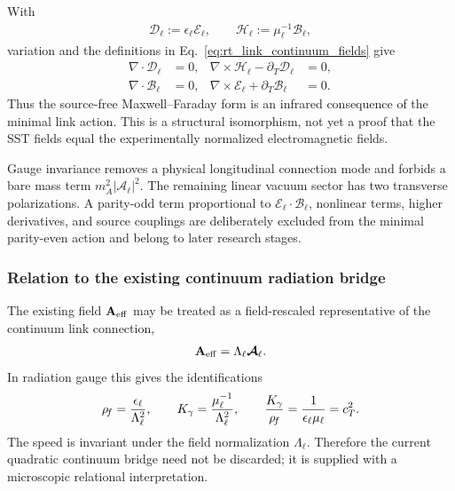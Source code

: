 With
\begin{align}
    \boldsymbol{\mathcal D}_\ell
    :=\epsilon_\ell\boldsymbol{\mathcal E}_\ell,
    \qquad
    \boldsymbol{\mathcal H}_\ell
    :=\mu_\ell^{-1}\boldsymbol{\mathcal B}_\ell,
\end{align}
variation and the definitions in Eq.~\eqref{eq:rt_link_continuum_fields} give
\begin{align}
    \nabla\cdot\boldsymbol{\mathcal D}_\ell&=0,
    &
    \nabla\times\boldsymbol{\mathcal H}_\ell
    -\partial_T\boldsymbol{\mathcal D}_\ell&=0,
    \\
    \nabla\cdot\boldsymbol{\mathcal B}_\ell&=0,
    &
    \nabla\times\boldsymbol{\mathcal E}_\ell
    +\partial_T\boldsymbol{\mathcal B}_\ell&=0.
    \label{eq:rt_link_source_free_maxwell_structure}
\end{align}
Thus the source-free Maxwell--Faraday form is an infrared consequence of the
minimal link action.  This is a structural isomorphism, not yet a proof that the
SST fields equal the experimentally normalized electromagnetic fields.

Gauge invariance removes a physical longitudinal connection mode and forbids a
bare mass term $m_A^2|\boldsymbol{\mathcal A}_\ell|^2$.  The remaining linear
vacuum sector has two transverse polarizations.  A parity-odd term proportional
to $\boldsymbol{\mathcal E}_\ell\cdot\boldsymbol{\mathcal B}_\ell$, nonlinear
terms, higher derivatives, and source couplings are deliberately excluded from
the minimal parity-even action and belong to later research stages.

\subsubsection{Relation to the existing continuum radiation bridge}

The existing field $\mathbf A_{\rm eff}$ may be treated as a field-rescaled
representative of the continuum link connection,
\begin{align}
    \mathbf A_{\rm eff}
    =
    \Lambda_\ell\boldsymbol{\mathcal A}_\ell.
\end{align}
In radiation gauge this gives the identifications
\begin{align}
    \rho_{\!f}
    =
    \frac{\epsilon_\ell}{\Lambda_\ell^2},
    \qquad
    K_\gamma
    =
    \frac{\mu_\ell^{-1}}{\Lambda_\ell^2},
    \qquad
    \frac{K_\gamma}{\rho_{\!f}}
    =
    \frac{1}{\epsilon_\ell\mu_\ell}
    =c_T^2.
    \label{eq:rt_link_to_Aeff_normalization}
\end{align}
The speed is invariant under the field normalization $\Lambda_\ell$.  Therefore
the current quadratic continuum bridge need not be discarded; it is supplied
with a microscopic relational interpretation.

